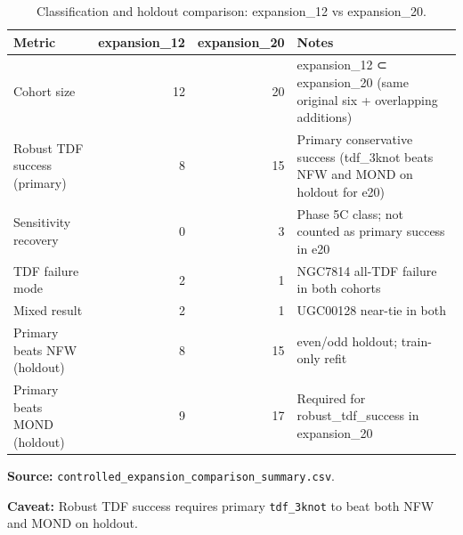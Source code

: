 \begin{table}[htbp]
\centering
\caption{Classification and holdout comparison: expansion\_12 vs expansion\_20.}
\label{tab:classification}
\footnotesize
\begin{tabular}{@{}l r r p{4.5cm}@{}}
\toprule
Metric & expansion\_12 & expansion\_20 & Notes \\
\midrule
Cohort size & 12 & 20 & expansion\_12 ⊂ expansion\_20 (same original six + overlapping additions) \\
Robust TDF success (primary) & 8 & 15 & Primary conservative success (tdf\_3knot beats NFW and MOND on holdout for e20) \\
Sensitivity recovery & 0 & 3 & Phase 5C class; not counted as primary success in e20 \\
TDF failure mode & 2 & 1 & NGC7814 all-TDF failure in both cohorts \\
Mixed result & 2 & 1 & UGC00128 near-tie in both \\
Primary beats NFW (holdout) & 8 & 15 & even/odd holdout; train-only refit \\
Primary beats MOND (holdout) & 9 & 17 & Required for robust\_tdf\_success in expansion\_20 \\
\bottomrule
\end{tabular}
\vspace{0.4em}
{\footnotesize
\par\noindent\textbf{Source:} \texttt{controlled\_expansion\_comparison\_summary.csv}.
\par\noindent\textbf{Caveat:} Robust TDF success requires primary \texttt{tdf\_3knot} to beat both NFW and MOND on holdout.
\par
}
\end{table}
